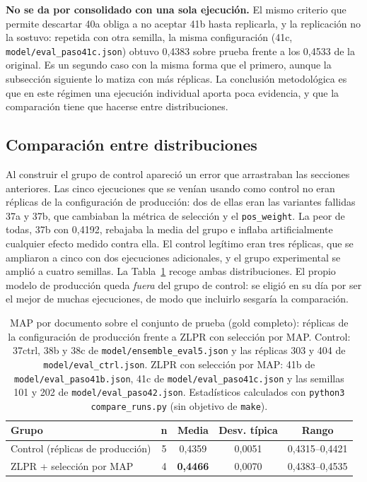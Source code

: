 \textbf{No se da por consolidado con una sola ejecución.} El mismo criterio que permite descartar 40a obliga a no aceptar 41b hasta replicarla, y la replicación no la sostuvo: repetida con otra semilla, la misma configuración (41c, \texttt{model/\allowbreak eval\_paso41c.json}) obtuvo 0{,}4383 sobre prueba frente a los 0{,}4533 de la original. Es un segundo caso con la misma forma que el primero, aunque la subsección siguiente lo matiza con más réplicas. La conclusión metodológica es que en este régimen una ejecución individual aporta poca evidencia, y que la comparación tiene que hacerse entre distribuciones.

\subsection{Comparación entre distribuciones}
\label{sec:anexoF-distribuciones}

Al construir el grupo de control apareció un error que arrastraban las secciones anteriores. Las cinco ejecuciones que se venían usando como control no eran réplicas de la configuración de producción: dos de ellas eran las variantes fallidas 37a y 37b, que cambiaban la métrica de selección y el \texttt{pos\_weight}. La peor de todas, 37b con 0{,}4192, rebajaba la media del grupo e inflaba artificialmente cualquier efecto medido contra ella. El control legítimo eran tres réplicas, que se ampliaron a cinco con dos ejecuciones adicionales, y el grupo experimental se amplió a cuatro semillas. La Tabla~\ref{tab:map-distribuciones} recoge ambas distribuciones. El propio modelo de producción queda \emph{fuera} del grupo de control: se eligió en su día por ser el mejor de muchas ejecuciones, de modo que incluirlo sesgaría la comparación.

\begin{table}[h]
\centering
\caption{MAP por documento sobre el conjunto de prueba (gold completo): réplicas de la configuración de producción frente a ZLPR con selección por MAP. Control: 37ctrl, 38b y 38c de \texttt{model/\allowbreak ensemble\_eval5.json} y las réplicas 303 y 404 de \texttt{model/\allowbreak eval\_ctrl.json}. ZLPR con selección por MAP: 41b de \texttt{model/\allowbreak eval\_paso41b.json}, 41c de \texttt{model/\allowbreak eval\_paso41c.json} y las semillas 101 y 202 de \texttt{model/\allowbreak eval\_paso42.json}. Estadísticos calculados con \texttt{python3 compare\_runs.py} (sin objetivo de \texttt{make}).}
\label{tab:map-distribuciones}
\begin{tabular}{lcccc}
\hline
\textbf{Grupo} & \textbf{n} & \textbf{Media} & \textbf{Desv. típica} & \textbf{Rango} \\
\hline
Control (réplicas de producción) & 5 & 0{,}4359 & 0{,}0051 & 0{,}4315--0{,}4421 \\
ZLPR + selección por MAP & 4 & \textbf{0{,}4466} & 0{,}0070 & 0{,}4383--0{,}4535 \\
\hline
\end{tabular}
\end{table}

